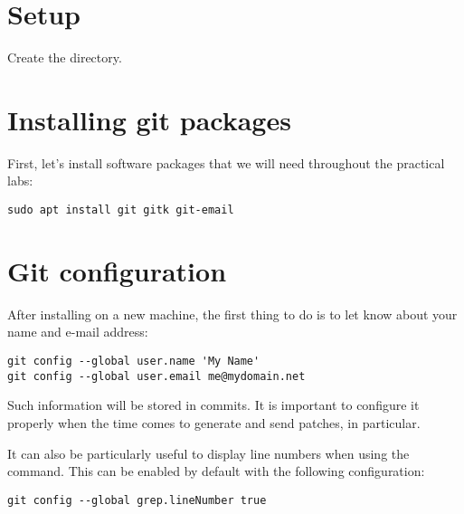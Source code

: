
\section{Setup}

Create the  directory.

\section{Installing git packages}

First, let's install software packages that we will need
throughout the practical labs:

\begin{verbatim}
sudo apt install git gitk git-email
\end{verbatim}

\section{Git configuration}

After installing  on a new machine, the first thing to do is
to let  know about your name and e-mail address:

\begin{verbatim}
git config --global user.name 'My Name'
git config --global user.email me@mydomain.net
\end{verbatim}

Such information will be stored in commits. It is important
to configure it properly when the time comes to generate and
send patches, in particular.

It can also be particularly useful to display line numbers when using the
 command. This can be enabled by default with the following
configuration:

\begin{verbatim}
git config --global grep.lineNumber true
\end{verbatim}



